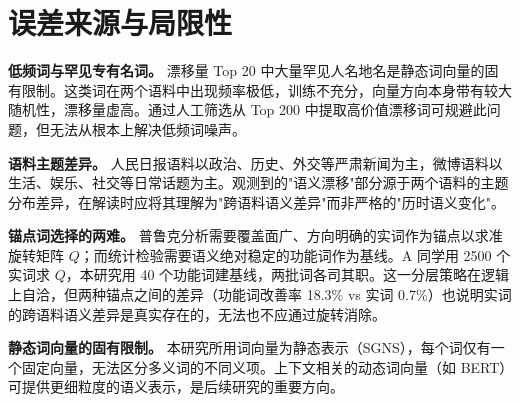 \documentclass{article}
\begin{document}
\section{误差来源与局限性}

\textbf{低频词与罕见专有名词。}
漂移量 Top 20 中大量罕见人名地名是静态词向量的固有限制。这类词在两个语料中出现频率极低，训练不充分，向量方向本身带有较大随机性，漂移量虚高。通过人工筛选从 Top 200 中提取高价值漂移词可规避此问题，但无法从根本上解决低频词噪声。

\textbf{语料主题差异。}
人民日报语料以政治、历史、外交等严肃新闻为主，微博语料以生活、娱乐、社交等日常话题为主。观测到的"语义漂移"部分源于两个语料的主题分布差异，在解读时应将其理解为"跨语料语义差异"而非严格的"历时语义变化"。

\textbf{锚点词选择的两难。}
普鲁克分析需要覆盖面广、方向明确的实词作为锚点以求准旋转矩阵 $Q$；而统计检验需要语义绝对稳定的功能词作为基线。A 同学用 2500 个实词求 $Q$，本研究用 40 个功能词建基线，两批词各司其职。这一分层策略在逻辑上自洽，但两种锚点之间的差异（功能词改善率 18.3\% vs 实词 0.7\%）也说明实词的跨语料语义差异是真实存在的，无法也不应通过旋转消除。

\textbf{静态词向量的固有限制。}
本研究所用词向量为静态表示（SGNS），每个词仅有一个固定向量，无法区分多义词的不同义项。上下文相关的动态词向量（如 BERT）可提供更细粒度的语义表示，是后续研究的重要方向。
\end{document}
